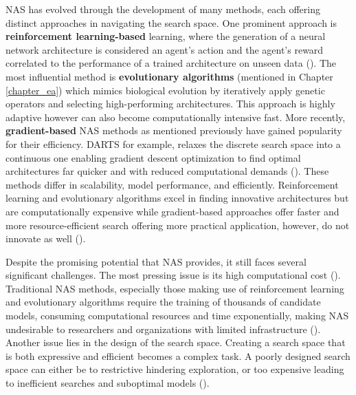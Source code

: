\noindent NAS has evolved through the development of many methods, each offering distinct approaches in navigating the search space. One prominent approach is \textbf{reinforcement learning-based} learning, where the generation of a neural network architecture is considered an agent's action and the agent's reward correlated to the performance of a trained architecture on unseen data (\cite{elsken2019neural}). The most influential method is \textbf{evolutionary algorithms} (mentioned in Chapter \ref{chapter_ea}) which mimics biological evolution by iteratively apply genetic operators and selecting high-performing architectures. This approach is highly adaptive however can also become computationally intensive fast. More recently, \textbf{gradient-based} NAS methods as mentioned previously have gained popularity for their efficiency. DARTS for example, relaxes the discrete search space into a continuous one enabling gradient descent optimization to find optimal architectures far quicker and with reduced computational demands (\cite{liu2021survey}). These methods differ in scalability, model performance, and efficiently. Reinforcement learning and evolutionary algorithms excel in finding innovative architectures but are computationally expensive while gradient-based approaches offer faster and more resource-efficient search offering more practical application, however, do not innovate as well (\cite{elsken2019neural}). \bigskip

\noindent Despite the promising potential that NAS provides, it still faces several significant challenges. The most pressing issue is its high computational cost (\cite{liu2021survey}). Traditional NAS methods, especially those making use of reinforcement learning and evolutionary algorithms require the training of thousands of candidate models, consuming computational resources and time exponentially, making NAS undesirable to researchers and organizations with limited infrastructure (\cite{elsken2019neural}). Another issue lies in the design of the search space. Creating a search space that is both expressive and efficient becomes a complex task. A poorly designed search space can either be to restrictive hindering exploration, or too expensive leading to inefficient searches and suboptimal models (\cite{liu2021survey}). \bigskip

